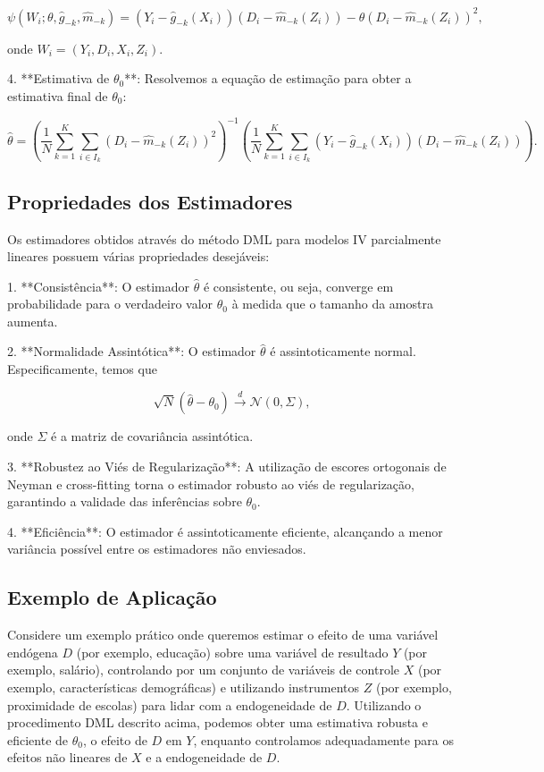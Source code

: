 \documentclass[a4paper,12pt]{article}[abntex2]
\begin{document}
\[
\psi(W_i; \theta, \hat{g}_{-k}, \hat{m}_{-k}) = (Y_i - \hat{g}_{-k}(X_i))(D_i - \hat{m}_{-k}(Z_i)) - \theta (D_i - \hat{m}_{-k}(Z_i))^2,
\]

onde $W_i = (Y_i, D_i, X_i, Z_i)$.

4. **Estimativa de $\theta_0$**: Resolvemos a equação de estimação para obter a estimativa final de $\theta_0$:

\[
\hat{\theta} = \left( \frac{1}{N} \sum_{k=1}^K \sum_{i \in I_k} (D_i - \hat{m}_{-k}(Z_i))^2 \right)^{-1} \left( \frac{1}{N} \sum_{k=1}^K \sum_{i \in I_k} (Y_i - \hat{g}_{-k}(X_i))(D_i - \hat{m}_{-k}(Z_i)) \right).
\]

\subsection*{Propriedades dos Estimadores}

Os estimadores obtidos através do método DML para modelos IV parcialmente lineares possuem várias propriedades desejáveis:

1. **Consistência**: O estimador $\hat{\theta}$ é consistente, ou seja, converge em probabilidade para o verdadeiro valor $\theta_0$ à medida que o tamanho da amostra aumenta.

2. **Normalidade Assintótica**: O estimador $\hat{\theta}$ é assintoticamente normal. Especificamente, temos que

\[
\sqrt{N}(\hat{\theta} - \theta_0) \xrightarrow{d} \mathcal{N}(0, \Sigma),
\]

onde $\Sigma$ é a matriz de covariância assintótica.

3. **Robustez ao Viés de Regularização**: A utilização de escores ortogonais de Neyman e cross-fitting torna o estimador robusto ao viés de regularização, garantindo a validade das inferências sobre $\theta_0$.

4. **Eficiência**: O estimador é assintoticamente eficiente, alcançando a menor variância possível entre os estimadores não enviesados.

\subsection*{Exemplo de Aplicação}

Considere um exemplo prático onde queremos estimar o efeito de uma variável endógena $D$ (por exemplo, educação) sobre uma variável de resultado $Y$ (por exemplo, salário), controlando por um conjunto de variáveis de controle $X$ (por exemplo, características demográficas) e utilizando instrumentos $Z$ (por exemplo, proximidade de escolas) para lidar com a endogeneidade de $D$. Utilizando o procedimento DML descrito acima, podemos obter uma estimativa robusta e eficiente de $\theta_0$, o efeito de $D$ em $Y$, enquanto controlamos adequadamente para os efeitos não lineares de $X$ e a endogeneidade de $D$.
\end{document}
